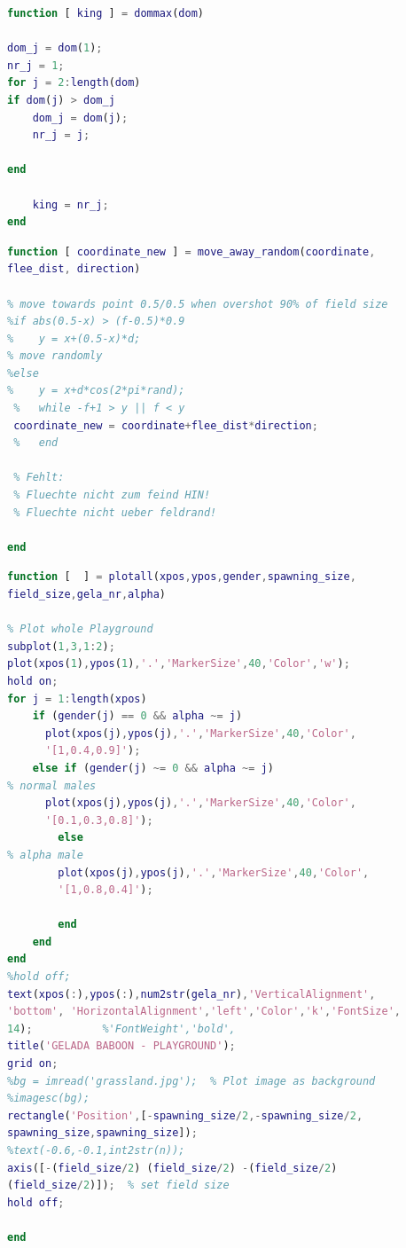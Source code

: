 \documentclass[11pt]{article}
\begin{document}
\begin{lstlisting}[language=Matlab, backgroundcolor=\color{blue!10}, frame=single, framerule=0.1pt,commentstyle=\color{blue}, caption=function: dommax.m]
function [ king ] = dommax(dom)

dom_j = dom(1);
nr_j = 1;
for j = 2:length(dom)
if dom(j) > dom_j
    dom_j = dom(j);
    nr_j = j;
    
end   
    
    king = nr_j;
end
\end{lstlisting}

\begin{lstlisting}[language=Matlab, backgroundcolor=\color{blue!10}, frame=single, framerule=0.1pt, commentstyle=\color{blue}, caption=function: move\_away\_random.m]
function [ coordinate_new ] = move_away_random(coordinate, 
flee_dist, direction)

% move towards point 0.5/0.5 when overshot 90% of field size
%if abs(0.5-x) > (f-0.5)*0.9
%    y = x+(0.5-x)*d;
% move randomly
%else
%    y = x+d*cos(2*pi*rand);
 %   while -f+1 > y || f < y
 coordinate_new = coordinate+flee_dist*direction;
 %   end
 
 % Fehlt:
 % Fluechte nicht zum feind HIN!
 % Fluechte nicht ueber feldrand!

end
\end{lstlisting}

\begin{lstlisting}[language=Matlab, backgroundcolor=\color{blue!10}, frame=single, framerule=0.1pt,commentstyle=\color{blue}, caption=function: plotall.m]
function [  ] = plotall(xpos,ypos,gender,spawning_size,
field_size,gela_nr,alpha)

% Plot whole Playground
subplot(1,3,1:2);
plot(xpos(1),ypos(1),'.','MarkerSize',40,'Color','w');
hold on;
for j = 1:length(xpos)
    if (gender(j) == 0 && alpha ~= j)                                     % females
      plot(xpos(j),ypos(j),'.','MarkerSize',40,'Color',
      '[1,0.4,0.9]');
    else if (gender(j) ~= 0 && alpha ~= j)                  
% normal males
      plot(xpos(j),ypos(j),'.','MarkerSize',40,'Color',
      '[0.1,0.3,0.8]');
        else                                                
% alpha male
        plot(xpos(j),ypos(j),'.','MarkerSize',40,'Color',
        '[1,0.8,0.4]');    
      
        end
    end
end
%hold off;
text(xpos(:),ypos(:),num2str(gela_nr),'VerticalAlignment',
'bottom', 'HorizontalAlignment','left','Color','k','FontSize',
14);           %'FontWeight','bold',
title('GELADA BABOON - PLAYGROUND');
grid on;
%bg = imread('grassland.jpg');  % Plot image as background
%imagesc(bg);
rectangle('Position',[-spawning_size/2,-spawning_size/2,
spawning_size,spawning_size]);
%text(-0.6,-0.1,int2str(n));
axis([-(field_size/2) (field_size/2) -(field_size/2) 
(field_size/2)]);  % set field size
hold off;

end
\end{lstlisting}
\end{document}
